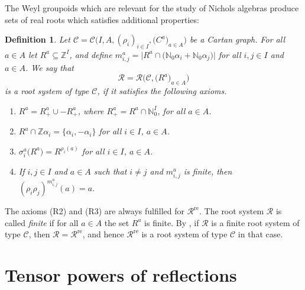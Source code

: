 \documentclass[10pt,a4paper]{amsart}
\numberwithin{equation}{section}
\newtheorem{Definition}[Theorem]{Definition}
\newcommand{\NN }{\mathbb{N}}
\newcommand{\ZZ }{\mathbb{Z}}
\newcommand{\Cc }{\mathcal{C}}
\newcommand{\rsC }{\mathcal{R}}
\newcommand{\re }{^\mathrm{re}}
\begin{document}
The Weyl groupoids which are relevant for the study of Nichols algebras produce sets of real roots which satisfies additional properties:

\begin{Definition}
Let $\Cc =\Cc \big(I,A,(\rho_i)_{i\in I},\big(C ^a\big)_{a\in A}\big)$ be a Cartan graph.
For all $a\in A$ let $R^a\subseteq \ZZ ^I$, and define
$m_{i,j}^a= \big|R^a \cap \big(\NN_0 \alpha_i + \NN_0 \alpha_j\big)\big|$ for all $i,j\in
I$ and $a\in A$. We say that
\[ \rsC = \rsC \big(\Cc , \big(R^a\big)_{a\in A}\big) \]
is a {\it root system of type} $\Cc $, if it satisfies the following axioms.
\begin{enumerate}\itemsep=0pt
\item[(R1)]
$R^a=R^a_+\cup - R^a_+$, where $R^a_+=R^a\cap \NN_0^I$, for all $a\in A$.
\item[(R2)]
$R^a\cap \ZZ\alpha_i=\{\alpha_i,-\alpha_i\}$ for all $i\in I$, $a\in A$.
\item[(R3)]
$\sigma _i^a\big(R^a\big) = R^{\rho_i(a)}$ for all $i\in I$, $a\in A$.
\item[(R4)]
If $i,j\in I$ and $a\in A$ such that $i\not=j$ and $m_{i,j}^a$ is finite, then
$(\rho_i\rho_j)^{m_{i,j}^a}(a)=a$.
\end{enumerate}
\end{Definition}

The axioms (R2) and (R3) are always fulfilled for $\rsC \re $.
The root system $\rsC $ is called {\it finite} if for all $a\in A$ the set $R^a$ is finite.
By \cite[Proposition~2.12]{p-CH09a}, if $\rsC $ is a finite root system
of type $\Cc $, then $\rsC =\rsC \re $, and hence $\rsC \re $ is a root
system of type $\Cc $ in that case.

\section{Tensor powers of reflections}\label{sec: tensor powers}
\end{document}
